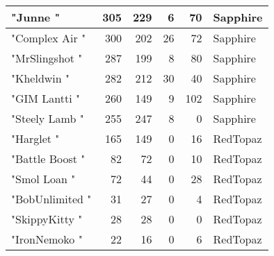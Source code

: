 \documentclass{article}
\begin{document}
\begin{table}[htbp]
\begin{tabular}{|l|r|r|r|r|l|}
"Junne " & 305 & 229 & 6 & 70 & Sapphire \\ \hline
"Complex Air " & 300 & 202 & 26 & 72 & Sapphire \\ \hline
"MrSlingshot " & 287 & 199 & 8 & 80 & Sapphire \\ \hline
"Kheldwin " & 282 & 212 & 30 & 40 & Sapphire \\ \hline
"GIM Lantti " & 260 & 149 & 9 & 102 & Sapphire \\ \hline
"Steely Lamb " & 255 & 247 & 8 & 0 & Sapphire \\ \hline
"Harglet " & 165 & 149 & 0 & 16 & RedTopaz \\ \hline
"Battle Boost " & 82 & 72 & 0 & 10 & RedTopaz \\ \hline
"Smol Loan " & 72 & 44 & 0 & 28 & RedTopaz \\ \hline
"BobUnlimited " & 31 & 27 & 0 & 4 & RedTopaz \\ \hline
"SkippyKitty " & 28 & 28 & 0 & 0 & RedTopaz \\ \hline
"IronNemoko " & 22 & 16 & 0 & 6 & RedTopaz \\ \hline
\end{tabular}
\end{table}
\end{document}
